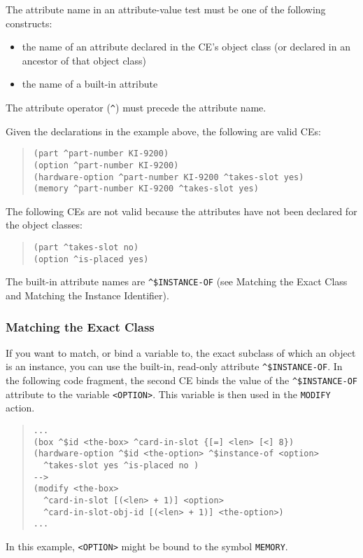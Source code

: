 The attribute name in an attribute-value test must be one
of the following constructs:
\begin{itemize}
\item the name of an attribute declared in the CE's object class (or
  declared in an ancestor of that object class)
\item the name of a built-in attribute
\end{itemize}
The attribute operator (\verb|^|) must precede the attribute name.

Given the declarations in the example above, the following are valid
CEs:

\begin{quote}
\begin{verbatim}
(part ^part-number KI-9200)
(option ^part-number KI-9200)
(hardware-option ^part-number KI-9200 ^takes-slot yes)
(memory ^part-number KI-9200 ^takes-slot yes)
\end{verbatim}
\end{quote}

The following CEs are not valid because the attributes
have not been declared for the object classes:

\begin{quote}
\begin{verbatim}
(part ^takes-slot no)
(option ^is-placed yes)
\end{verbatim}
\end{quote}

The built-in attribute names are \verb|^$INSTANCE-OF| (see
Matching the Exact Class and Matching the Instance
Identifier).

\subsubsection{Matching the Exact Class}

If you want to match, or bind a variable to, the exact subclass of
which an object is an instance, you can use the built-in, read-only
attribute
\verb|^$INSTANCE-OF|. In the following code fragment, the second CE
binds the value of the \verb|^$INSTANCE-OF| attribute to the variable
\verb|<OPTION>|. This variable is then used in the \verb|MODIFY|
action.

\begin{quote}
\begin{verbatim}
...
(box ^$id <the-box> ^card-in-slot {[=] <len> [<] 8})
(hardware-option ^$id <the-option> ^$instance-of <option>
  ^takes-slot yes ^is-placed no )
-->
(modify <the-box>
  ^card-in-slot [(<len> + 1)] <option>
  ^card-in-slot-obj-id [(<len> + 1)] <the-option>)
...
\end{verbatim}
\end{quote}
In this example, \verb|<OPTION>| might be bound to the symbol
\verb|MEMORY|.

